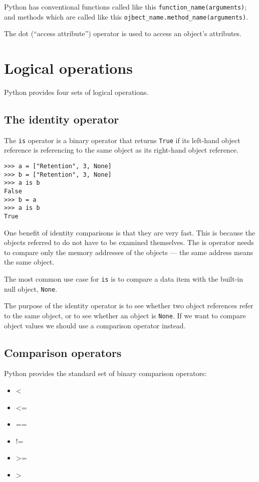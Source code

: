 Python has conventional functions called like this \verb|function_name(arguments)|;
and methods which are called like this \verb|ojbect_name.method_name(arguments)|.

The dot (``access attribute'') operator is used to access an object's attributes.

\section{Logical operations}

Python provides four sets of logical operations.


\subsection{The identity operator}

The \verb|is| operator is a binary operator that returns \verb|True| if its left-hand object reference is referencing to the same object as its right-hand object reference.


\begin{lstlisting}
>>> a = ["Retention", 3, None]
>>> b = ["Retention", 3, None]
>>> a is b
False
>>> b = a
>>> a is b
True
\end{lstlisting}



One benefit of identity comparisons is that they are very fast.
This is because the objects referred to do not have to be examined themselves.
The is operator needs to compare only the memory addresses of the objects --- the same address means the same object.



The most common use case for \verb|is| is to compare a data item with the built-in null object, \verb|None|.



The purpose of the identity operator is to see whether two object references refer to the same object, or to see whether an object is \verb|None|.
If we want to compare object values we should use a comparison operator instead.

\subsection{Comparison operators}

Python provides the standard set of binary comparison operators:

\begin{itemize}
\item <
\item <=
\item ==
\item !=
\item >=
\item >
\end{itemize}

